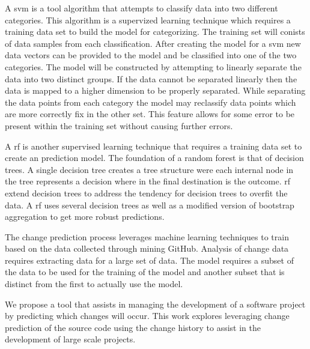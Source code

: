 A \gls{svm} is a tool algorithm that attempts to classify data into two different categories. This algorithm is a supervized learning technique which requires a training data set to build the model for categorizing. The training set will conists of data samples from each classification. After creating the model for a \gls{svm} new data vectors can be provided to the model and be classified into one of the two categories. The model will be constructed by attempting to linearly separate the data into two distinct groups. If the data cannot be separated linearly then the data is mapped to a higher dimension to be properly separated. While separating the data points from each category the model may reclassify data points which are more correctly fix in the other set. This feature allows for some error to be present within the training set without causing further errors.%

A \gls{rf} is another supervised learning technique that requires a training data set to create an prediction model. The foundation of a random forest is that of decision trees. A single decision tree creates a tree structure were each internal node in the tree represents a decision where in the final destination is the outcome. \gls{rf} extend decision trees to address the tendency for decision trees to overfit the data. A \gls{rf} uses several decision trees as well as a modified version of bootstrap aggregation to get more robust predictions.




The change prediction process leverages machine learning techniques to train based on the data collected through mining GitHub. Analysis of change data requires extracting data for a large set of data. The model requires a subset of the data to be used for the training of the model and another subset that is distinct from the first to actually use the model.


We propose a tool that assists in managing the development of a software project by predicting which changes will occur. This work explores leveraging change prediction of the source code using the change history to assist in the development of large scale projects.


